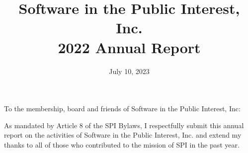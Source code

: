 \documentclass[a4paper]{report}
\begin{document}
\title{Software in the Public Interest, Inc.\\
2022 Annual Report}
\date{July 10, 2023}

\maketitle

\newpage


\hspace{1em}

To the membership, board and friends of Software in the Public Interest, Inc:

As mandated by Article 8 of the SPI Bylaws, I respectfully submit this annual report on the activities of Software in the Public Interest, Inc. and extend my thanks to all of those who contributed to the mission of SPI in the past year.
\end{document}

